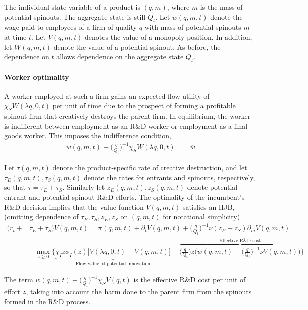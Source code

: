 \documentclass[12pt,english]{article}
\theoremstyle{remark}
\begin{document}
The individual state variable of a product is $(q,m)$, where $m$ is the mass of potential spinouts. The aggregate state is still $Q_t$. Let $w(q,m,t)$ denote the wage paid to employees of a firm of quality $q$ with mass of potential spinouts $m$ at time $t$. Let $V(q,m,t)$ denotes the value of a monopoly position. In addition, let $W(q,m,t)$ denote the value of a potential spinout. As before, the dependence on $t$ allows dependence on the aggregate state $Q_t$. 

\paragraph{Worker optimality}

A worker employed at such a firm gains an expected flow utility of $\chi_S W(\lambda q,0,t)$ per unit of time due to the prospect of forming a profitable spinout firm that creatively destroys the parent firm.  In equilibrium, the worker is indifferent between employment as an R\&D worker or employment as a final goods worker. This imposes the indifference condition,
\begin{align}
w(q,m,t) + \Big(\frac{q}{Q_t}\Big)^{-1} \chi_S W(\lambda q,0,t) &= \overline{w} \label{wage_rd}
\end{align}

Let $\tau(q,m,t)$ denote the product-specific rate of creative destruction, and let $\tau_E(q,m,t),\tau_S(q,m,t)$ denote the rates for entrants and spinouts, respectively, so that $\tau = \tau_E + \tau_S$. Similarly let $z_E(q,m,t),z_S(q,m,t)$ denote potential entrant and potential spinout R\&D efforts. The optimality of the incumbent's R\&D decision implies that the value function $V(q,m,t)$ satisfies an HJB, (omitting dependence of $\tau_E,\tau_S,z_E,z_S$ on $(q,m,t)$ for notational simplicity)
\begin{align}
(r_t +& \tau_E + \tau_S) V(q,m,t) = \pi(q,m,t) + \partial_tV(q,m,t) + \Big(\frac{q}{Q_t}\Big)^{-1} \nu (z_E + z_S) \partial_m V(q,m,t)\nonumber \\ 
&+ \max_{z \ge 0} \Big\{ \underbrace{\chi_I z\phi_I(z) \Big[V(\lambda q,0,t) - V(q,m,t) \Big]}_{\textrm{Flow value of potential innovation}} - \overbrace{\Big(\frac{q}{Q_t}\Big) z \Big(  w(q,m,t) + \Big(\frac{q}{Q_t}\Big)^{-1} \nu V(q,m,t) \Big)}^{\textrm{Effective R\&D cost}} \Big\} \label{HJB_I}
\end{align}

The term $w(q,m,t) + \Big(\frac{q}{Q_t}\Big)^{-1} \chi_S V(q,t)$ is the effective R\&D cost per unit of effort $z$, taking into account the harm done to the parent firm from the spinouts formed in the R\&D process. 
\end{document}
